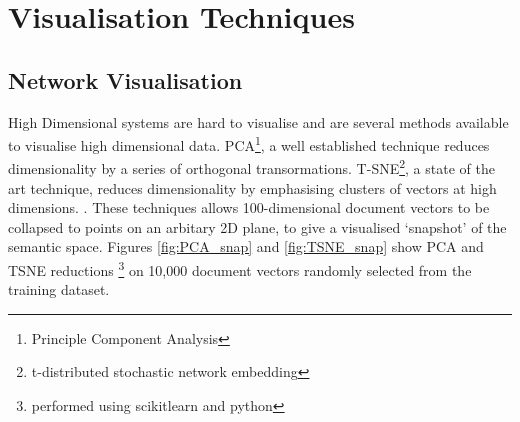 \section{Visualisation Techniques}
\subsection{Network Visualisation}
High Dimensional systems are hard to visualise and are several methods available to visualise high dimensional data. PCA\footnote{Principle Component Analysis}\cite{PCA}, a well established technique reduces dimensionality by a series of orthogonal transormations. T-SNE\footnote{t-distributed stochastic network embedding }, a state of the art technique, reduces dimensionality by emphasising clusters of vectors at high dimensions. \cite{TSNE}. These techniques allows 100-dimensional document vectors to be collapsed to points on an arbitary 2D plane, to give a visualised `snapshot' of the semantic space. 
Figures \ref{fig:PCA_snap} and \ref{fig:TSNE_snap} show PCA and TSNE reductions \footnote{performed using scikitlearn and python} \cite{scikitlearn} on 10,000 document vectors randomly selected from the training dataset.


